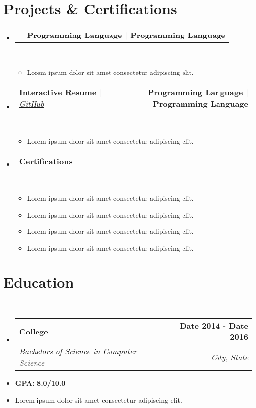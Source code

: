 \documentclass[letterpaper,11pt]{article}
\makeatletter
\newcommand{\resumeItem}[1]{
  \item\small{
    {#1 \vspace{0pt}}
  }
}
\newcommand{\resumeSubheading}[4]{
  \vspace{-2pt}\item
    \begin{tabular*}{1.0\textwidth}[t]{l@{\extracolsep{\fill}}r}
      \textbf{#1} & \textbf{\small #2} \\
      \textit{\small#3} & \textit{\small #4} \\
    \end{tabular*}\vspace{-7pt}
}
\newcommand{\resumeProjectHeading}[2]{
    \item
    \begin{tabular*}{1.001\textwidth}{l@{\extracolsep{\fill}}r}
      \small#1 & \textbf{\small #2}\\
    \end{tabular*}\vspace{-7pt}
}
\newcommand{\resumeSubHeadingListStart}{\begin{itemize}[leftmargin=0.0in, label={}]}
\newcommand{\resumeSubHeadingListEnd}{\end{itemize}}\vspace{0pt}
\newcommand{\resumeItemListStart}{\begin{itemize}}
\newcommand{\resumeItemListEnd}{\end{itemize}\vspace{-5pt}}
\makeatother
\begin{document}
\section{Projects \& Certifications} 
    \vspace{-5pt}
    \resumeSubHeadingListStart
    \resumeProjectHeading
            {\textbf{{Project#1}} $|$ \emph{\href{https://github.com//}{GitHub}}}{Programming Language $|$ Programming Language}
            \\[5mm]
          \resumeItemListStart
            \resumeItem{Lorem ipsum dolor sit amet consectetur adipiscing elit.}
          \resumeItemListEnd
 \vspace{-20pt}
 \resumeProjectHeading
            {\textbf{{Interactive Resume}} $|$ \emph{\href{https://github.com/}{GitHub}}}{Programming Language $|$ Programming Language}
            \\[5mm]
          \resumeItemListStart
            \resumeItem{Lorem ipsum dolor sit amet consectetur adipiscing elit.}
          \resumeItemListEnd
 \vspace{-17pt}
 \resumeProjectHeading
{\textbf{{Certifications}} }{}
\\[5mm]
\resumeItemListStart
\resumeItem{Lorem ipsum dolor sit amet consectetur adipiscing elit.}
\resumeItem {Lorem ipsum dolor sit amet consectetur adipiscing elit.}
\resumeItem{Lorem ipsum dolor sit amet consectetur adipiscing elit.}
\resumeItem{Lorem ipsum dolor sit amet consectetur adipiscing elit.}
\resumeItemListEnd

\resumeSubHeadingListEnd
\vspace{-28pt}
 
\section{Education} \\[1mm]

  \resumeSubHeadingListStart
    \resumeSubheading
      {College}{Date 2014 - Date 2016}
      {Bachelors of Science in Computer Science
      }{City, State}
  \resumeSubHeadingListEnd
    \resumeItemListStart
        \resumeItem { \textbf{GPA: 8.0/10.0}}
        \vspace{-7pt}
        \resumeItem {Lorem ipsum dolor sit amet consectetur adipiscing elit.}
    \resumeItemListEnd
    \vspace{-12pt}
 \vspace{-16pt}
 \vspace{3pt}
\vspace{10pt}

\vspace{-15pt}
\end{document}

